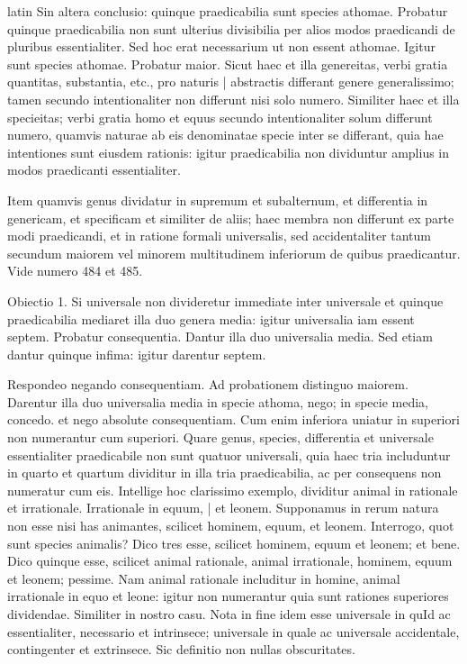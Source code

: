 \begin{otherlanguage*}{latin}
\pstart
Sin altera conclusio:
quinque praedicabilia sunt species athomae. Probatur quinque praedicabilia non sunt ulterius divisibilia per alios modos praedicandi de pluribus essentialiter. Sed hoc erat necessarium ut non essent athomae. Igitur sunt species athomae. Probatur maior. Sicut haec et illa genereitas, verbi gratia quantitas, substantia, etc., pro naturis \textnormal{|} abstractis differant genere generalissimo; tamen secundo intentionaliter non differunt nisi solo numero. Similiter haec et illa specieitas; verbi gratia homo et equus secundo intentionaliter solum differunt numero, quamvis naturae ab eis denominatae specie inter se differant, quia hae intentiones sunt eiusdem rationis:
igitur praedicabilia non dividuntur amplius in modos praedicanti essentialiter. 
\pend

\pstart
Item quamvis genus dividatur in supremum et subalternum, et differentia in genericam, et specificam et similiter de aliis; haec membra non differunt ex parte modi praedicandi, et in ratione formali universalis, sed accidentaliter tantum secundum maiorem vel minorem multitudinem inferiorum de quibus praedicantur. Vide numero 484 et 485. 
\pend

\pstart
Obiectio 1. Si universale non divideretur immediate inter universale et quinque praedicabilia mediaret illa duo genera media:
igitur universalia iam essent septem. Probatur consequentia. Dantur illa duo universalia media. Sed etiam dantur quinque infima:
igitur darentur septem. 
\pend

\pstart
Respondeo negando consequentiam. Ad probationem distinguo maiorem. Darentur illa duo universalia media in specie athoma, nego; in specie  media, concedo. et nego absolute consequentiam. Cum enim inferiora uniatur in superiori non numerantur cum superiori. Quare genus, species, differentia et universale essentialiter praedicabile non sunt quatuor universali, quia haec tria includuntur in quarto et quartum dividitur in illa tria praedicabilia, ac per consequens non numeratur cum eis. Intellige hoc clarissimo exemplo, dividitur animal in rationale et irrationale. Irrationale in equum, \textnormal{|} et leonem. Supponamus in rerum natura non esse nisi has animantes, scilicet hominem, equum, et leonem. Interrogo, quot sunt species animalis? Dico tres esse, scilicet hominem, equum et leonem; et bene. Dico quinque esse, scilicet animal rationale, animal irrationale, hominem, equum et leonem; pessime. Nam animal rationale includitur in homine, animal irrationale in equo et leone:
igitur non numerantur quia sunt rationes superiores dividendae. Similiter in nostro casu. Nota in fine idem esse universale in quId ac essentialiter, necessario et intrinsece; universale in quale ac universale accidentale, contingenter et extrinsece. Sic definitio non nullas obscuritates. 
\pend


\end{otherlanguage*}
